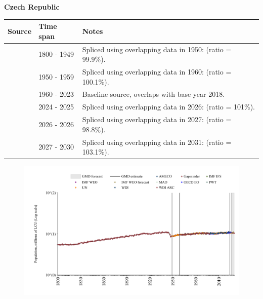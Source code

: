 \documentclass[12pt,a4paper,landscape]{article}
\begin{document}
\begin{adjustbox}{max totalsize={\paperwidth}{\paperheight},center}
\begin{minipage}[t][\textheight][t]{\textwidth}
\vspace*{0.5cm}
{}
\begin{center}
{\Large\bfseries Czech Republic}
\end{center}
\vspace{0.5cm}
\begin{table}[H]
\centering
\small
\begin{tabular}{|l|l|l|}
\hline
\textbf{Source} & \textbf{Time span} & \textbf{Notes} \\
\hline
\rowcolor{white}\cite{Gapminder}& 1800 - 1949 &Spliced using overlapping data in 1950: (ratio = 99.9\%).\\
\rowcolor{lightgray}\cite{IMF_IFS}& 1950 - 1959 &Spliced using overlapping data in 1960: (ratio = 100.1\%).\\
\rowcolor{white}\cite{WDI}& 1960 - 2023 &Baseline source, overlaps with base year 2018.\\
\rowcolor{lightgray}\cite{OECD_EO}& 2024 - 2025 &Spliced using overlapping data in 2026: (ratio = 101\%).\\
\rowcolor{white}\cite{AMECO}& 2026 - 2026 &Spliced using overlapping data in 2027: (ratio = 98.8\%).\\
\rowcolor{lightgray}\cite{Gapminder}& 2027 - 2030 &Spliced using overlapping data in 2031: (ratio = 103.1\%).\\
\hline
\end{tabular}
\end{table}
\begin{figure}[H]
\centering
\includegraphics[width=\textwidth,height=0.6\textheight,keepaspectratio]{graphs/CZE_pop.pdf}
\end{figure}
\end{minipage}
\end{adjustbox}
\end{document}

